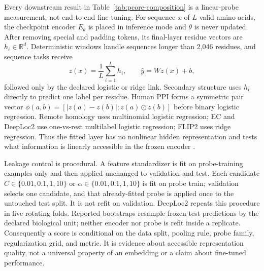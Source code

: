 \documentclass{article}
\begin{document}
Every downstream result in Table~\ref{tab:pcore-composition} is a linear-probe
measurement, not end-to-end fine-tuning. For sequence $x$ of $L$ valid amino
acids, the checkpoint encoder $E_\theta$ is placed in inference mode and
$\theta$ is never updated. After removing special and padding tokens, its
final-layer residue vectors are $h_i\in\mathbb{R}^d$. Deterministic windows
handle sequences longer than 2,046 residues, and sequence tasks receive
\[
  z(x)=\frac{1}{L}\sum_{i=1}^{L}h_i,
  \qquad \widehat{y}=Wz(x)+b,
\]
followed only by the declared logistic or ridge link. Secondary structure uses
$h_i$ directly to predict one label per residue. Human PPI forms a symmetric
pair vector
$\phi(a,b)=[\lvert z(a)-z(b)\rvert;z(a)\odot z(b)]$ before binary logistic
regression. Remote homology uses multinomial logistic regression; EC and
DeepLoc2 use one-vs-rest multilabel logistic regression; FLIP2 uses ridge
regression. Thus the fitted layer has no nonlinear hidden representation and
tests what information is linearly accessible in the frozen encoder
\citep{rao2019tape,xu2022peer}.

Leakage control is procedural. A feature standardizer is fit on probe-training
examples only and then applied unchanged to validation and test. Each candidate
$C\in\{0.01,0.1,1,10\}$ or
$\alpha\in\{0.01,0.1,1,10\}$ is fit on probe train; validation selects one
candidate, and that already-fitted probe is applied once to the untouched test
split. It is not refit on validation. DeepLoc2 repeats this procedure in five
rotating folds. Reported bootstraps resample frozen test predictions by the
declared biological unit; neither encoder nor probe is refit inside a replicate.
Consequently a score is conditional on the data split, pooling rule, probe
family, regularization grid, and metric. It is evidence about accessible
representation quality, not a universal property of an embedding or a claim
about fine-tuned performance.
\end{document}
